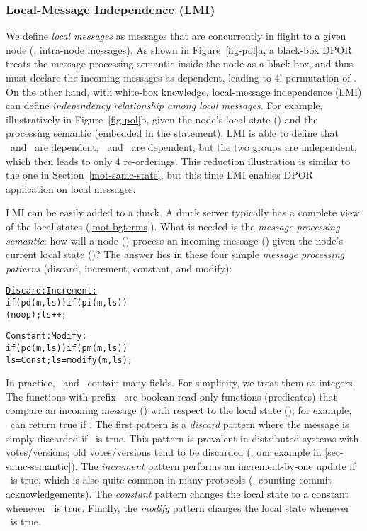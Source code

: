 
\subsubsection{Local-Message Independence (LMI)}
\label{sam-lmi}

We define {\em local messages} as messages that are concurrently in
flight to a given node (\ie, intra-node messages).  As shown in
Figure~\ref{fig-pol}a, a black-box DPOR treats the message processing
semantic inside the node as a black box, and thus must declare the
incoming messages as dependent, leading to 4! permutation
of \ma\mb\mc\md.  On the other hand, with white-box knowledge,
local-message independence (LMI) can define {\em independency
relationship among local messages}.  For example, illustratively in
Figure~\ref{fig-pol}b, given the node's local state (\ls) and the
processing semantic (embedded in the  statement), LMI is able
to define that \ma\ and \mb\ are dependent, \mc\ and \md\ are
dependent, but the two groups are independent, which then leads to
only 4 re-orderings.  This reduction illustration is similar to the
one in Section~\ref{mot-samc-state}, but this time LMI enables DPOR
application on local messages.


LMI can be easily added to a dmck.  A dmck server typically has a
complete view of the local states (\sec\ref{mot-bgterms}).  What is
needed is the {\em message processing semantic}: how will a node (\nn)
process an incoming message (\mm) given the node's current local state
(\ls)?  The answer lies in these four simple {\em message processing
patterns} (discard, increment, constant, and modify):

\begin{minipage}{\textwidth}
\begin{alltt}
\vfive
     \underline{Discard:}           \underline{Increment:}  
     if (pd(m,ls))      if (pi(m,ls))
      (noop);             ls++;       

     \underline{Constant:}          \underline{Modify:}  
     if (pc(m,ls))      if (pm(m,ls))
       ls = Const;        ls = modify(m,ls);
\end{alltt}
\vfive
\end{minipage}

In practice, \ls\ and \mm\ contain many fields.  For simplicity, we
treat them as integers.  The functions with prefix \pp\ are boolean
read-only functions (predicates) that compare an incoming message
(\mm) with respect to the local state (\ls); for example, \pd\ can
return true if .  The first pattern is a {\em discard} pattern
where the message is simply discarded if \pd\ is true.  This pattern
is prevalent in distributed systems with votes/versions; old
votes/versions tend to be discarded (\eg, our example
in \sec\ref{sec-samc-semantic}).  The {\em increment} pattern performs an
increment-by-one update if \pi\ is true, which is also quite common in
many protocols (\eg, counting commit acknowledgements).  The {\em
constant} pattern changes the local state to a constant whenever \pc\
is true.  Finally, the {\em modify} pattern changes the local state
whenever \pm\ is true.


